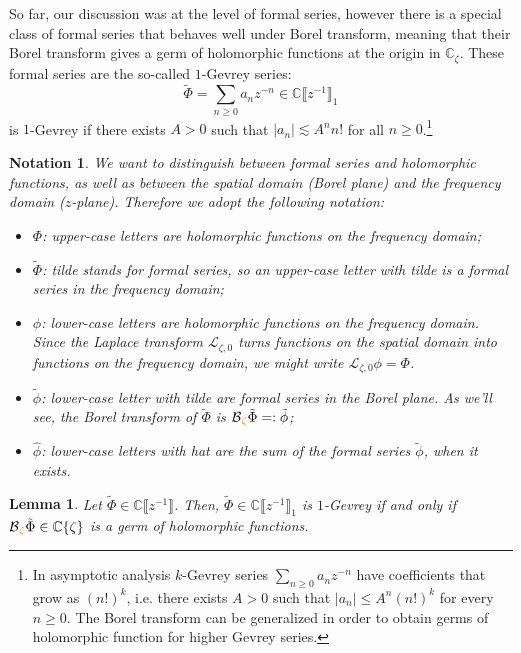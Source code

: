 \documentclass{article}
\theoremstyle{definition}
\newcommand{\C}{\mathbb{C}}
\newcommand{\laplace}{\mathcal{L}}
\newcommand{\borel}{\mathcal{B}}
\theoremstyle{plain}
\newtheorem{lemma}[definition]{Lemma}
\newtheorem*{notation*}{Notation}
\begin{document}
So far, our discussion was at the level of formal series, however there is a special class of formal series that behaves well under Borel transform, meaning that their Borel transform gives a germ of holomorphic functions at the origin in $\C_{\zeta}$. These formal series are the so-called $1$-Gevrey series:
\[\tilde{\Phi}=\sum_{n\geq 0}a_nz^{-n}\in\C \llbracket z^{-1} \rrbracket_1\]
is $1$-Gevrey if there exists $A>0$ such that $|a_n|\lesssim A^n n!$ for all $n\geq 0$.\footnote{In asymptotic analysis $k$-Gevrey series $\sum_{n\geq 0}a_nz^{-n}$ have coefficients that grow as $(n!)^{k}$, i.e. there exists $A>0$ such that $|a_n|\leq A^n (n!)^k$ for every $n\geq 0$. The Borel transform can be generalized in order to obtain germs of holomorphic function for higher Gevrey series. }  

\begin{notation*}
We want to distinguish between formal series and holomorphic functions, as well as between the spatial domain (Borel plane) and the frequency domain ($z$-plane). Therefore we adopt the following notation:
\begin{itemize}
\item $\Phi$: upper-case letters are holomorphic functions on the frequency domain;
\item $\tilde{\Phi}$: \textit{tilde} stands for formal series, so an upper-case letter with \textit{tilde} is a formal series in the frequency domain;
\item $\phi$: lower-case letters are holomorphic functions on the frequency domain. Since the Laplace transform $\laplace_{\zeta, 0}$ turns functions on the spatial domain into functions on the frequency domain, we might write $\laplace_{\zeta,0}\phi=\Phi$.
\item $\tilde{\phi}$: lower-case letter with \textit{tilde} are formal series in the Borel plane. As we’ll see, the Borel transform of $\tilde{\Phi}$ is $\borel\textcolor{orange}{_\zeta} \tilde{\Phi}=:\tilde{\phi}$; 
\item $\hat{\phi}$: lower-case letters with \textit{hat} are the sum of the formal series $\tilde{\phi}$, when it exists.  
\end{itemize}
\end{notation*}  

\begin{lemma}
Let $\tilde{\Phi}\in\C \llbracket z^{-1} \rrbracket$. Then, $\tilde{\Phi}\in\C \llbracket z^{-1} \rrbracket_1$ is $1$-Gevrey if and only if $\borel\textcolor{orange}{_\zeta}\tilde{\Phi}\in\C\lbrace\zeta\rbrace$ is a germ of holomorphic functions. 
\end{lemma}
\end{document}
